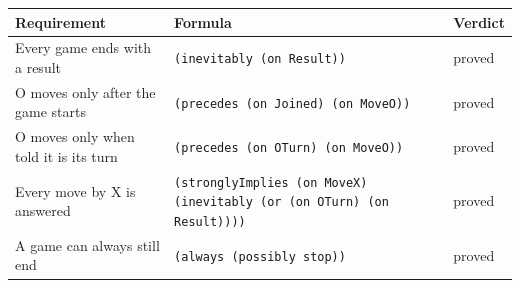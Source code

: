 {\footnotesize\begin{tabular}{@{}p{}p{}l@{}}
\toprule
Requirement & Formula & Verdict \\
\midrule
Every game ends with a result & \texttt{(inevitably (on Result))} & proved \\
O moves only after the game starts & \texttt{(precedes (on Joined) (on MoveO))} & proved \\
O moves only when told it is its turn & \texttt{(precedes (on OTurn) (on MoveO))} & proved \\
Every move by X is answered & \texttt{(stronglyImplies (on MoveX) (inevitably (or (on OTurn) (on Result))))} & proved \\
A game can always still end & \texttt{(always (possibly stop))} & proved \\
\bottomrule
\end{tabular}}
